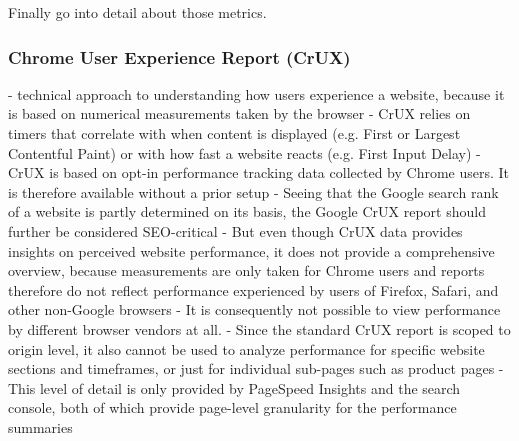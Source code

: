 Finally go into detail about those metrics.
















\subsubsection{Chrome User Experience Report (CrUX)}


- technical approach to understanding how users experience a website, because it is based on numerical measurements taken by the browser
- CrUX relies on timers that correlate with when content is displayed (e.g. First or Largest Contentful Paint) or with how fast a website reacts (e.g. First Input Delay)
- CrUX is based on opt-in performance tracking data collected by Chrome users. It is therefore available without a prior setup
-  Seeing that the Google search rank of a website is partly determined on its basis, the Google CrUX report should further be considered SEO-critical
- But even though CrUX data provides insights on perceived website performance, it does not provide a comprehensive overview, because measurements are only taken for Chrome users and reports therefore do not reflect performance experienced by users of Firefox, Safari, and other non-Google browsers
- It is consequently not possible to view performance by different browser vendors at all.
- Since the standard CrUX report is scoped to origin level, it also cannot be used to analyze performance for specific website sections and timeframes, or just for individual sub-pages such as product pages
- This level of detail is only provided by PageSpeed Insights and the search console, both of which provide page-level granularity for the performance summaries















